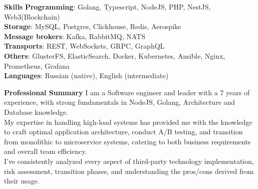 \documentclass{resume} %
\begin{document}
\begin{rSection}{\textbf{Skills}}
       \textbf{Programming}: Golang, Typescript, NodeJS, PHP, NestJS, Web3(Blockchain)
       \\ \textbf{Storage}: MySQL, Postgres, Clickhouse, Redis, Aerospike
       \\ \textbf{Message brokers}: Kafka, RabbitMQ, NATS
       \\ \textbf{Transports}: REST, WebSockets, GRPC, GraphQL
       \\ \textbf{Others}: GlusterFS, ElasticSearch, Docker, Kubernetes, Ansible, Nginx, Prometheus, Grafana
       \\ \textbf{Languages}: Russian (native), English (intermediate)
\end{rSection}

\begin{rSection}{\textbf{Professional Summary}}
{ I am a Software engineer and leader with a 7 years of experience, with strong fundamentals in NodeJS, Golang, Architecture and Database
knowledge.
\\ My expertise in handling high-load systems has provided me with the knowledge to craft optimal application architecture, conduct A/B testing, and transition from monolithic to microservice systems, catering to both business requirements and overall team efficiency.
\\ I've consistently analyzed every aspect of third-party technology implementation, risk assessment, transition phases, and understanding the pros/cons derived from their usage.
}

\end{rSection}

\end{document}
